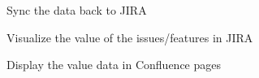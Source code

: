 \documentclass{article}
\begin{document}
\begin{appendices}
\begin{figure}[H]
    \centering
    \captionsetup{labelformat=empty}
    \caption{Sync the data back to JIRA}
    \noindent{}
\end{figure}

\begin{figure}[H]
    \centering
    \captionsetup{labelformat=empty}
    \caption{Visualize the value of the issues/features in JIRA}
    \noindent{}
\end{figure}

\begin{figure}[H]
    \centering
    \captionsetup{labelformat=empty}
    \caption{Display the value data in Confluence pages}
    \noindent{}
\end{figure}


\end{appendices}
\end{document}
